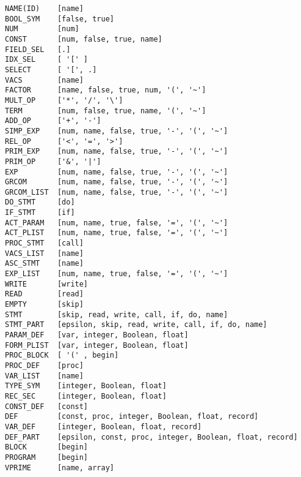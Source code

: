 \documentclass{article}
\begin{document}
\begin{verbatim}
NAME(ID)    [name]
BOOL_SYM    [false, true]
NUM         [num]
CONST       [num, false, true, name]
FIELD_SEL   [.]
IDX_SEL     [ '[' ]
SELECT      [ '[', .]
VACS        [name]
FACTOR      [name, false, true, num, '(', '~']
MULT_OP     ['*', '/', '\']
TERM        [num, false, true, name, '(', '~']
ADD_OP      ['+', '-']
SIMP_EXP    [num, name, false, true, '-', '(', '~']
REL_OP      ['<', '=', '>']
PRIM_EXP    [num, name, false, true, '-', '(', '~']
PRIM_OP     ['&', '|']
EXP         [num, name, false, true, '-', '(', '~']
GRCOM       [num, name, false, true, '-', '(', '~']
GRCOM_LIST  [num, name, false, true, '-', '(', '~']
DO_STMT     [do]
IF_STMT     [if]
ACT_PARAM   [num, name, true, false, '=', '(', '~']
ACT_PLIST   [num, name, true, false, '=', '(', '~']
PROC_STMT   [call]
VACS_LIST   [name]
ASC_STMT    [name]
EXP_LIST    [num, name, true, false, '=', '(', '~']
WRITE       [write]
READ        [read]
EMPTY       [skip]
STMT        [skip, read, write, call, if, do, name]
STMT_PART   [epsilon, skip, read, write, call, if, do, name]
PARAM_DEF   [var, integer, Boolean, float]
FORM_PLIST  [var, integer, Boolean, float]
PROC_BLOCK  [ '(' , begin]
PROC_DEF    [proc]
VAR_LIST    [name]
TYPE_SYM    [integer, Boolean, float]
REC_SEC     [integer, Boolean, float]
CONST_DEF   [const]
DEF         [const, proc, integer, Boolean, float, record]
VAR_DEF     [integer, Boolean, float, record]
DEF_PART    [epsilon, const, proc, integer, Boolean, float, record]
BLOCK       [begin]
PROGRAM     [begin]
VPRIME      [name, array]
\end{verbatim}
\end{document}
